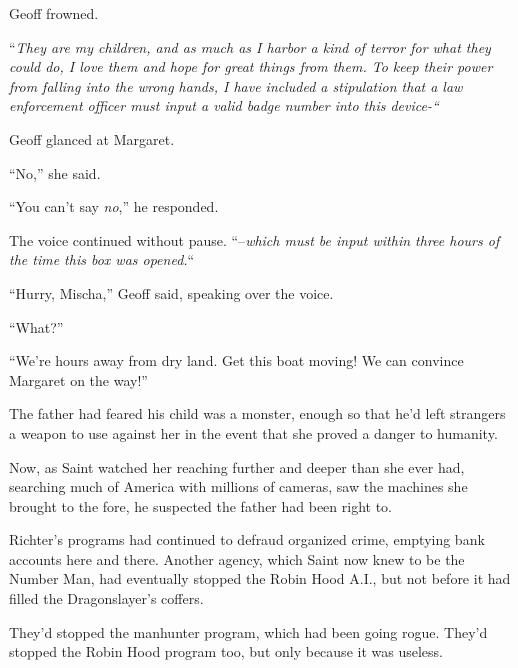 Geoff frowned.



``\emph{They are my children, and as much as I harbor a kind of terror for what they could do, I love them and hope for great things from them.  To keep their power from falling into the wrong hands, I have included a stipulation that a law enforcement officer must input a valid badge number into this device-``}



Geoff glanced at Margaret.



``No,'' she said.



``You can't say \emph{no},'' he responded.



The voice continued without pause.  ``--\emph{which must be input within three hours of the time this box was opened.}``



``Hurry, Mischa,'' Geoff said, speaking over the voice.



``What?''



``We're hours away from dry land.  Get this boat moving!  We can convince Margaret on the way!''



\sectionbreak



The father had feared his child was a monster, enough so that he'd left strangers a weapon to use against her in the event that she proved a danger to humanity.



Now, as Saint watched her reaching further and deeper than she ever had, searching much of America with millions of cameras, saw the machines she brought to the fore, he suspected the father had been right to.



Richter's programs had continued to defraud organized crime, emptying bank accounts here and there.  Another agency, which Saint now knew to be the Number Man, had eventually stopped the Robin Hood A.I., but not before it had filled the Dragonslayer's coffers.



They'd stopped the manhunter program, which had been going rogue.  They'd stopped the Robin Hood program too, but only because it was useless.




